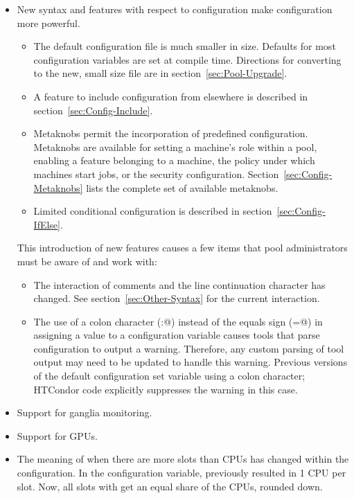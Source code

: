 \begin{itemize}

\item New syntax and features with respect to configuration
make configuration more powerful.
  \begin{itemize}
  \item The default configuration file is much smaller in size.
   Defaults for most configuration variables are set at compile time.
   Directions for converting to the new, small size file are in
   section~\ref{sec:Pool-Upgrade}.
  \item A feature to include configuration from elsewhere
   is described in section~\ref{sec:Config-Include}.
  \item Metaknobs permit the incorporation of predefined configuration.
   Metaknobs are available for setting a machine's role within
   a pool, enabling a feature belonging to a machine, the policy under which
   machines start jobs, or the security configuration.
   Section~\ref{sec:Config-Metaknobs} lists the complete set of available
   metaknobs.
  \item Limited conditional configuration is described in 
   section~\ref{sec:Config-IfElse}.
  \end{itemize}
This introduction of new features causes a few items that pool
administrators must be aware of and work with:
  \begin{itemize}
  \item The interaction of comments and the line continuation character
   has changed.  See  section~\ref{sec:Other-Syntax} for the current
   interaction. 
  \item The use of a colon character (\verb@:@) instead of the
   equals sign (\verb@=@) in assigning a value to a configuration variable
   causes tools that parse configuration to output a warning.
   Therefore, any custom parsing of tool output may need to be updated to
   handle this warning.
   Previous versions of the default configuration set variable
    using a colon character;
   HTCondor code explicitly suppresses the warning in this case.
  \end{itemize}

\item Support for ganglia monitoring.

\item Support for GPUs.

\item The meaning of  when there are more 
slots than CPUs has changed within the configuration. 
In the  configuration variable,
 previously resulted in 1 CPU per slot. 
Now, all slots with  get an equal share of the CPUs, 
rounded down.


\end{itemize}

